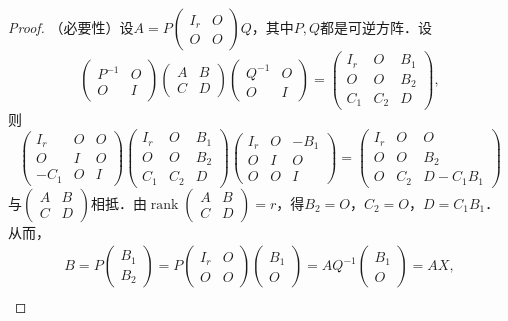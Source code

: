 \documentclass[a4paper,fontset=windows]{ctexbook}
\theoremstyle{definition}
\DeclareMathOperator{\rank}{rank}
\begin{document}
\begin{proof}
（必要性）设$A=P\begin{pmatrix}I_r&O \\ O&O\end{pmatrix}Q$，其中$P,Q$都是可逆方阵．设
$$\begin{pmatrix}P^{-1}&O \\ O&I\end{pmatrix}\begin{pmatrix}A&B \\ C&D\end{pmatrix}\begin{pmatrix}Q^{-1}&O \\ O&I\end{pmatrix}=\begin{pmatrix}I_r&O&B_1 \\ O&O&B_2 \\ C_1&C_2&D\end{pmatrix},$$
则
$$\begin{pmatrix}I_r&O&O \\ O&I&O \\ -C_1&O&I\end{pmatrix}\begin{pmatrix}I_r&O&B_1 \\ O&O&B_2 \\ C_1&C_2&D\end{pmatrix}\begin{pmatrix}I_r&O&-B_1 \\ O&I&O \\ O&O&I\end{pmatrix}=\begin{pmatrix}I_r&O&O \\ O&O&B_2 \\ O&C_2&D-C_1B_1\end{pmatrix}$$
与$\begin{pmatrix}A&B \\ C&D\end{pmatrix}$相抵．由$\rank\begin{pmatrix}A&B \\ C&D\end{pmatrix}=r$，得$B_2=O$，$C_2=O$，$D=C_1B_1$．从而，
\begin{gather*}
B=P\begin{pmatrix}B_1 \\ B_2\end{pmatrix}=P\begin{pmatrix}I_r&O \\ O&O\end{pmatrix}\begin{pmatrix}B_1 \\ O\end{pmatrix}=AQ^{-1}\begin{pmatrix}B_1 \\ O\end{pmatrix}=AX, \\

\end{gather*}
\end{proof}
\end{document}
